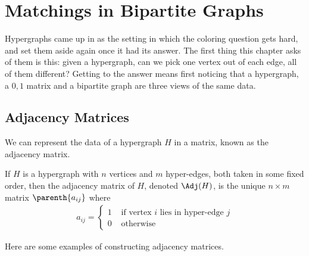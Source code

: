\section{Matchings in Bipartite Graphs}

Hypergraphs came up in  as the setting in which the coloring question gets hard, and  set them aside again once it had its answer. The first thing this chapter asks of them is this: given a hypergraph, can we pick one vertex out of each edge, all of them different? Getting to the answer means first noticing that a hypergraph, a $0,1$ matrix and a bipartite graph are three views of the same data.

\subsection{Adjacency Matrices}

We can represent the data of a hypergraph $H$ in a matrix, known as the adjacency matrix.

\begin{boxdefinition}
    If $H$ is a hypergraph with $n$ vertices and $m$ hyper-edges, both taken in some fixed order, then the adjacency matrix of $H$, denoted $\Adj(H)$, is the unique $n \times m$ matrix $\parenth{a_{ij}}$ where
    \begin{align*}
        a_{ij} =
        \begin{cases}
            1 & \text{ if vertex $i$ lies in hyper-edge $j$} \\
            0 & \text{ otherwise}
        \end{cases}
    \end{align*}
\end{boxdefinition}

Here are some examples of constructing adjacency matrices.

